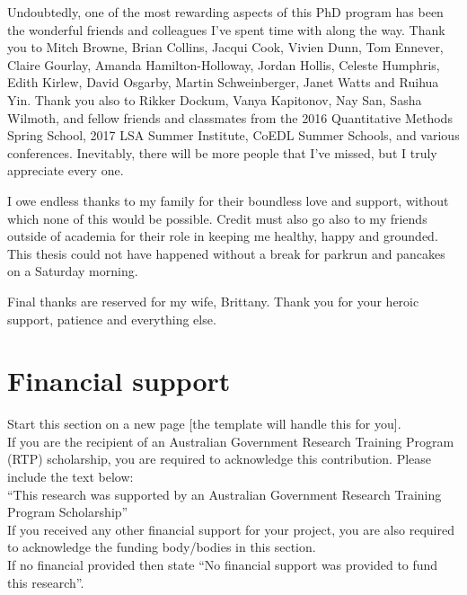 Undoubtedly, one of the most rewarding aspects of this PhD program has been the wonderful friends and colleagues I've spent time with along the way. Thank you to Mitch Browne, Brian Collins, Jacqui Cook, Vivien Dunn, Tom Ennever, Claire Gourlay, Amanda Hamilton-Holloway, Jordan Hollis, Celeste Humphris, Edith Kirlew, David Osgarby, Martin Schweinberger, Janet Watts and Ruihua Yin. Thank you also to Rikker Dockum, Vanya Kapitonov, Nay San, Sasha Wilmoth, and fellow friends and classmates from the 2016 Quantitative Methods Spring School, 2017 LSA Summer Institute, CoEDL Summer Schools, and various conferences. Inevitably, there will be more people that I've missed, but I truly appreciate every one.

I owe endless thanks to my family for their boundless love and support, without which none of this would be possible. Credit must also go also to my friends outside of academia for their role in keeping me healthy, happy and grounded. This thesis could not have happened without a break for parkrun and pancakes on a Saturday morning.

Final thanks are reserved for my wife, Brittany. Thank you for your heroic support, patience and everything else.



\clearpage
\section*{Financial support}

\begin{instructional}
    Start this section on a new page [the template will handle this for you].\\
    
    \noindent
    If you are the recipient of an Australian Government Research Training Program (RTP) scholarship, you are required to acknowledge this contribution.  Please include the text below:\\
    
    \noindent
    ``This research was supported by an Australian Government Research Training Program Scholarship''\\
    
    \noindent
    If you received any other financial support for your project, you are also required to acknowledge the funding body/bodies in this section.\\
    
    \noindent
    If no financial provided then state ``No financial support was provided to fund this research''.
\end{instructional}

